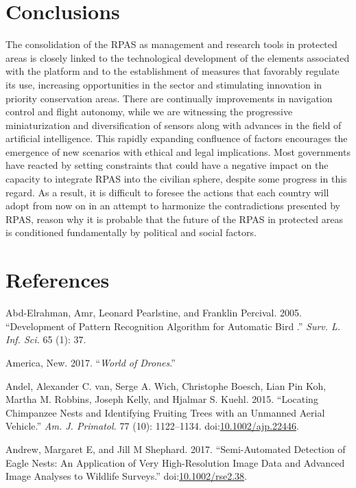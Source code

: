 \documentclass[]{interact}
\theoremstyle{plain}%
\theoremstyle{definition}
\theoremstyle{remark}
\begin{document}
\section{Conclusions}\label{conclusions}

The consolidation of the RPAS as management and research tools in
protected areas is closely linked to the technological development of
the elements associated with the platform and to the establishment of
measures that favorably regulate its use, increasing opportunities in
the sector and stimulating innovation in priority conservation areas.
There are continually improvements in navigation control and flight
autonomy, while we are witnessing the progressive miniaturization and
diversification of sensors along with advances in the field of
artificial intelligence. This rapidly expanding confluence of factors
encourages the emergence of new scenarios with ethical and legal
implications. Most governments have reacted by setting constraints that
could have a negative impact on the capacity to integrate RPAS into the
civilian sphere, despite some progress in this regard. As a result, it
is difficult to foresee the actions that each country will adopt from
now on in an attempt to harmonize the contradictions presented by RPAS,
reason why it is probable that the future of the RPAS in protected areas
is conditioned fundamentally by political and social factors.

\section*{References}\label{references}

\hypertarget{refs}{}
\hypertarget{ref-abd-elrahman_development_2005}{}
Abd-Elrahman, Amr, Leonard Pearlstine, and Franklin Percival. 2005.
``Development of Pattern Recognition Algorithm for Automatic Bird .''
\emph{Surv. L. Inf. Sci.} 65 (1): 37.

\hypertarget{ref-Bworld_of_drones2017}{}
America, New. 2017. ``\emph{World of Drones}.''

\hypertarget{ref-van_andel_locating_2015}{}
Andel, Alexander C. van, Serge A. Wich, Christophe Boesch, Lian Pin Koh,
Martha M. Robbins, Joseph Kelly, and Hjalmar S. Kuehl. 2015. ``Locating
Chimpanzee Nests and Identifying Fruiting Trees with an Unmanned Aerial
Vehicle.'' \emph{Am. J. Primatol.} 77 (10): 1122--1134.
doi:\href{https://doi.org/10.1002/ajp.22446}{10.1002/ajp.22446}.

\hypertarget{ref-andrew_semi-automated_2017}{}
Andrew, Margaret E, and Jill M Shephard. 2017. ``Semi-Automated
Detection of Eagle Nests: An Application of Very High-Resolution Image
Data and Advanced Image Analyses to Wildlife Surveys.''
doi:\href{https://doi.org/10.1002/rse2.38}{10.1002/rse2.38}.
\end{document}
